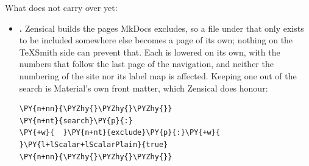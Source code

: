 \documentclass[a4paper,twoside]{article}
\begin{document}
What does not carry over yet:
\begin{itemize}
\item \textbf{.} Zensical builds the pages MkDocs excludes, so a file
under  that only exists to be included somewhere else becomes a page
of its own; nothing on the TeXSmith side can prevent that. Each is lowered
on its own, with the numbers that follow the last page of the navigation,
and neither the numbering of the site nor its label map is affected. Keeping
one out of the search is Material's own front matter, which Zensical does
honour:
\begin{tscode}[lang=yaml, engine=pygments]
\begin{Verbatim}[commandchars=\\\{\},breaklines, breakanywhere, commandchars=\\\{\}]
\PY{n+nn}{\PYZhy{}\PYZhy{}\PYZhy{}}
\PY{n+nt}{search}\PY{p}{:}
\PY{+w}{  }\PY{n+nt}{exclude}\PY{p}{:}\PY{+w}{ }\PY{l+lScalar+lScalarPlain}{true}
\PY{n+nn}{\PYZhy{}\PYZhy{}\PYZhy{}}
\end{Verbatim}
\end{tscode}
\end{itemize}
\end{document}
